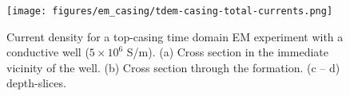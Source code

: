\begin{figure}
    \begin{center}
    \texttt{[image: figures/em\_casing/tdem-casing-total-currents.png]}
    \end{center}
\caption{
    Current density for a top-casing time domain EM experiment with a conductive well ($5\times 10^6$ S/m).
    (a) Cross section in the immediate vicinity of the well.
    (b) Cross section through the formation.
    (c -- d) depth-slices.
}
\label{fig:tdem-casing-total-currents}
\end{figure}



